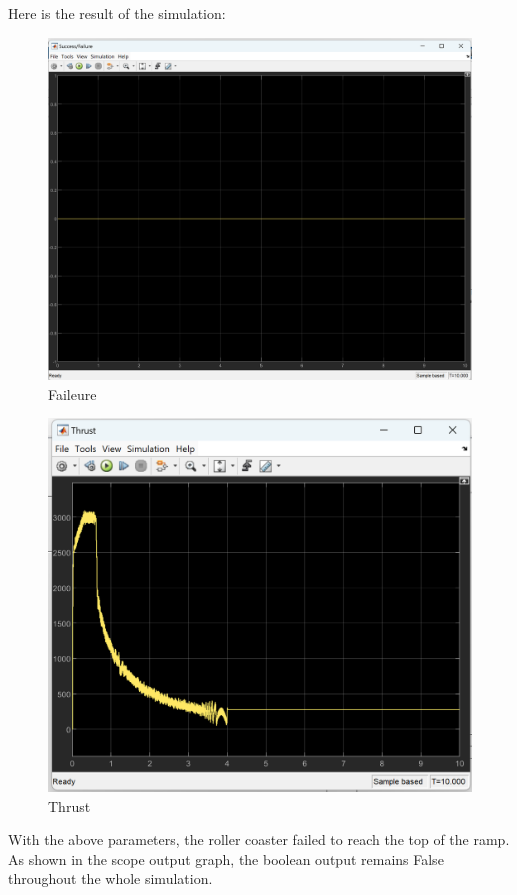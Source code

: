 \documentclass{article}
\begin{document}
    Here is the result of the simulation:
    \begin{figure}[H]
        \centering
        \includegraphics[width=0.8\linewidth]{failure_2.png}
        \caption{Faileure}
        \label{fig:enter-label}
    \end{figure}

    \begin{figure}[H]
        \centering
        \includegraphics[width=0.8\linewidth]{thrust_3.png}
        \caption{Thrust}
        \label{fig:enter-label}
    \end{figure}
    With the above parameters, the roller coaster failed to reach the top of the
    ramp. As shown in the scope output graph, the boolean output remains False
    throughout the whole simulation.
\end{document}
